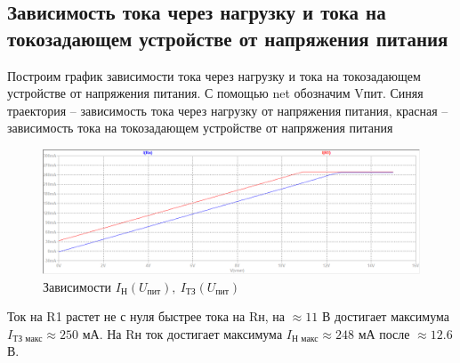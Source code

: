 \documentclass[a4paper, 12pt]{article}
\begin{document}
    \subsection{Зависимость тока через нагрузку и тока на токозадающем устройстве от напряжения питания}
    Построим график зависимости тока через нагрузку и тока на токозадающем устройстве от напряжения питания.
    С помощью net обозначим Vпит. Синяя траектория -- зависимость тока через нагрузку от напряжения питания,
    красная -- зависимость тока на токозадающем устройстве от напряжения питания
    \begin{figure}[H]
        \centering
        \includegraphics[scale=0.46]{3task_Iн(Vпит)_Iтз(Vпит).png}
        \captionsetup{skip=0pt}
        \caption{Зависимости $I_\text{Н}\left( U_\text{пит} \right),\ I_\text{ТЗ}\left( U_\text{пит} \right)$}
        \label{fig:3task_InVl_IlVl}
    \end{figure}
    \noindent Ток на R1 растет не с нуля быстрее тока на Rн, на $\approx11$ В достигает максимума
    $I_\text{ТЗ макс}\approx250$ мА. На Rн ток достигает максимума $I_\text{Н макс}\approx248$ мА после $\approx12.6$ В.
\end{document}
